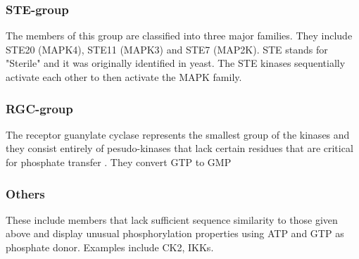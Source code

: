 \documentclass[a4paper, 11pt]{report}
\begin{document}
\subsubsection{STE-group}
The members of this group are classified into three major families. They include STE20 (MAPK4), STE11 (MAPK3) and STE7 (MAP2K).  STE stands for "Sterile" and it was originally identified in yeast. The STE kinases sequentially activate each other to then activate the MAPK family.\\

\subsubsection{RGC-group}
The receptor guanylate cyclase represents the smallest group of the kinases and they consist entirely of pesudo-kinases that lack certain residues that are critical for phosphate transfer \cite{manning2002protein}. They convert GTP to GMP\\

\subsubsection{Others}
These include members that lack sufficient sequence similarity to those given above and display unusual phosphorylation properties using ATP and GTP as phosphate donor. Examples include CK2, IKKs.\\
\end{document}

